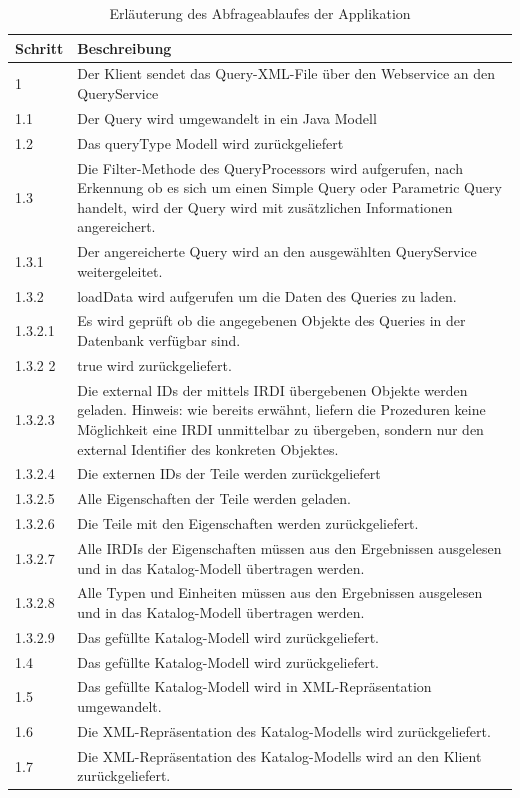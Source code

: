 \begin{table}[!hbt]\vspace{1ex}\centering\scriptsize\begin{tabular}{p{3cm}p{10cm}}
\toprule \rowcolor{mylightergray}
\textbf{Schritt} & \textbf{Beschreibung}\\
\midrule
1 &  Der Klient sendet das Query-XML-File über den Webservice an den QueryService \\
\hline
1.1 &  Der Query wird umgewandelt in ein Java Modell \\
\hline
1.2 &  Das queryType Modell wird zurückgeliefert \\
\hline
1.3 &  Die Filter-Methode des QueryProcessors wird aufgerufen, nach Erkennung ob es sich um einen Simple Query oder Parametric Query handelt, wird der Query wird mit zusätzlichen Informationen angereichert. \\
\hline
1.3.1 &  Der angereicherte Query wird an den ausgewählten QueryService weitergeleitet.  \\
\hline
1.3.2 &  loadData wird aufgerufen um die Daten des Queries zu laden. \\
\hline
1.3.2.1 &  Es wird geprüft ob die angegebenen Objekte des Queries in der Datenbank verfügbar sind. \\
\hline
1.3.2 2 &  true wird zurückgeliefert. \\
\hline
1.3.2.3 &  Die external IDs der mittels IRDI übergebenen Objekte werden geladen. Hinweis: wie bereits erwähnt, liefern die Prozeduren keine Möglichkeit eine IRDI unmittelbar zu übergeben, sondern nur den external Identifier des konkreten Objektes. \\
\hline
1.3.2.4 &  Die externen IDs der Teile werden zurückgeliefert \\
\hline
1.3.2.5 &  Alle Eigenschaften der Teile werden geladen.  \\
\hline
1.3.2.6 &  Die Teile mit den Eigenschaften werden zurückgeliefert. \\
\hline
1.3.2.7 &  Alle IRDIs der Eigenschaften müssen aus den Ergebnissen ausgelesen und in das Katalog-Modell übertragen werden. \\
\hline
1.3.2.8 &  Alle Typen und Einheiten müssen aus den Ergebnissen ausgelesen und in das Katalog-Modell übertragen werden. \\
\hline
1.3.2.9 &  Das gefüllte Katalog-Modell wird zurückgeliefert. \\
\hline
1.4 &  Das gefüllte Katalog-Modell wird zurückgeliefert. \\
\hline
1.5 &  Das gefüllte Katalog-Modell wird in XML-Repräsentation umgewandelt. \\
\hline
1.6 &  Die XML-Repräsentation des Katalog-Modells wird zurückgeliefert. \\
\hline
1.7 &  Die XML-Repräsentation des Katalog-Modells wird an den Klient zurückgeliefert. \\
\bottomrule
\end{tabular}
\caption{\label{tab.abfrageablauf}Erläuterung des Abfrageablaufes der Applikation}
\vspace{2ex}\end{table}

